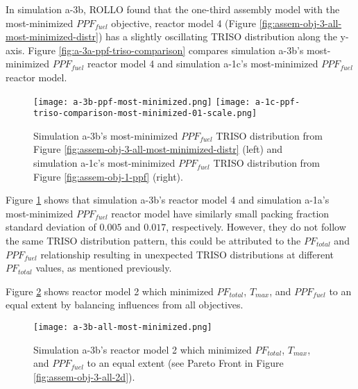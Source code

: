 In simulation a-3b, \gls{ROLLO} found that the one-third assembly model with the 
most-minimized $PPF_{fuel}$ objective, reactor model 4 (Figure 
\ref{fig:assem-obj-3-all-most-minimized-distr}) has a slightly oscillating TRISO 
distribution along the y-axis.
Figure \ref{fig:a-3a-ppf-triso-comparison} compares simulation a-3b's most-minimized 
$PPF_{fuel}$ reactor model 4 and simulation a-1c's most-minimized $PPF_{fuel}$ reactor 
model. 
\begin{figure}[htbp!]
    \centering
    \texttt{[image: a-3b-ppf-most-minimized.png]} 
    \texttt{[image: a-1c-ppf-triso-comparison-most-minimized-01-scale.png]} 
    \caption{Simulation a-3b's most-minimized $PPF_{fuel}$ TRISO distribution 
    from Figure \ref{fig:assem-obj-3-all-most-minimized-distr} (left) and simulation 
    a-1c's most-minimized $PPF_{fuel}$ TRISO distribution from Figure 
    \ref{fig:assem-obj-1-ppf} (right).}
    \label{fig:a-3b-ppf-triso-comparison}
\end{figure}
Figure \ref{fig:a-3b-ppf-triso-comparison} shows that simulation a-3b's reactor model 4 
and simulation a-1a's most-minimized $PPF_{fuel}$ reactor model have similarly small 
packing fraction standard deviation of  $0.005$ and $0.017$, respectively. 
However, they do not follow the same TRISO distribution pattern, this could be 
attributed to the $PF_{total}$ and $PPF_{fuel}$ relationship resulting in unexpected 
TRISO distributions at different $PF_{total}$ values, as mentioned previously.

Figure \ref{fig:a-3b-balanced-reactor-model} shows reactor model 2 which 
minimized $PF_{total}$, $T_{max}$, and $PPF_{fuel}$ to an equal extent by balancing 
influences from all objectives. 
\begin{figure}[htbp!]
    \centering
    \texttt{[image: a-3b-all-most-minimized.png]} 
    \caption{Simulation a-3b's reactor model 2 which minimized $PF_{total}$, $T_{max}$, 
    and $PPF_{fuel}$ to an equal extent (see Pareto Front in 
    Figure \ref{fig:assem-obj-3-all-2d}).}
\label{fig:a-3b-balanced-reactor-model}
\end{figure}

